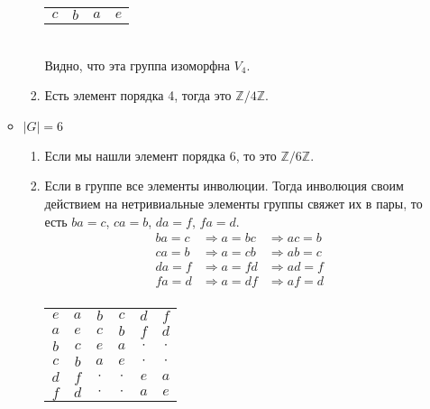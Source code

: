 \documentclass{article}
\begin{document}
\begin{enumerate}
\begin{itemize}
\begin{enumerate}
\begin{tabular}{c | c c c}
                                $c$ & $b$ & $a$ & $e$ \\
                            \end{tabular}\\
                        Видно, что эта группа изоморфна $V_4$.
                    \item Есть элемент порядка 4, тогда это $\mathbb{Z}/4\mathbb{Z}$.
                \end{enumerate}
            \item $|G|=6$
                \begin{enumerate}
                    \item Если мы нашли элемент порядка 6, то это $\mathbb{Z}/6\mathbb{Z}$.
                    \item Если в группе все элементы инволюции. Тогда инволюция
                        своим действием на нетривиальные элементы группы
                        свяжет их в пары, то есть $ba=c$, $ca=b$, $da=f$,
                        $fa=d$.
                        \begin{align*}
                            ba=c&\Rightarrow a=bc&\Rightarrow ac=b\\
                            ca=b&\Rightarrow a=cb&\Rightarrow ab=c\\
                            da=f&\Rightarrow a=fd&\Rightarrow ad=f\\
                            fa=d&\Rightarrow a=df&\Rightarrow af=d\\
                        \end{align*}
                        \begin{center}
                        \noindent\begin{tabular}{c | c c c c c}
                            $e$ & $a$ & $b$ & $c$ & $d$ & $f$ \\
                            \cline{1-6}
                            $a$ & $e$ & $c$ & $b$ & $f$ & $d$\\
                            $b$ & $c$ & $e$ & $a$ & $\cdot$ & $\cdot$\\
                            $c$ & $b$ & $a$ & $e$ & $\cdot$ & $\cdot$\\
                            $d$ & $f$ & $\cdot$ & $\cdot$ & $e$ & $a$\\
                            $f$ & $d$ & $\cdot$ & $\cdot$ & $a$ & $e$\\
                        \end{tabular}

\end{center}
\end{enumerate}
\end{itemize}
\end{enumerate}
\end{document}
